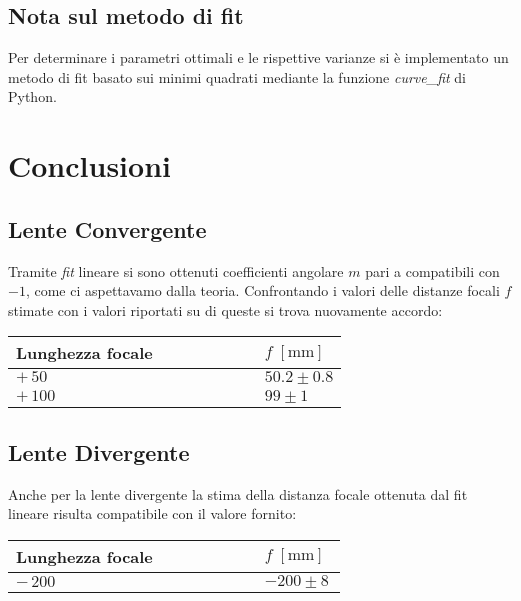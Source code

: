 \documentclass{article}[a4paper,11pt]
\begin{document}
\subsection*{Nota sul metodo di fit}
Per determinare i parametri ottimali e le rispettive varianze si \`e implementato un metodo di fit basato sui minimi quadrati mediante la funzione \emph{curve\_fit} di Python.

\section{Conclusioni}
\subsection*{Lente Convergente}
Tramite \emph{fit} lineare si sono ottenuti coefficienti angolare $m$ pari a compatibili con $-1$, come ci aspettavamo dalla teoria. Confrontando i valori delle distanze focali $f$ stimate con i valori riportati su di queste si trova nuovamente accordo:
\begin{table}[!hbt]
 \begin{center}
  \begin{tabular}{lccccccl}
  \toprule
  Lunghezza focale & & & & & & & $f \; [\si{\mm}]$ \\
  \midrule 
  \midrule
  $ +\, 50 $ & & & & & & & $ 50.2 \pm 0.8  $ \\
  $ +\, 100 $ & & & & & & & $ 99 \pm 1 $ \\ 
  \bottomrule 
  \end{tabular} 
 \end{center}
\end{table}
\subsection*{Lente Divergente}
Anche per la lente divergente la stima della distanza focale ottenuta dal fit lineare risulta compatibile con il valore fornito:
\begin{table}[!hbt]
 \begin{center}
  \begin{tabular}{lccccccl}
  \toprule
  Lunghezza focale & & & & & & & $f \; [\si{\mm}]$ \\
  \midrule 
  \midrule
  $ -\, 200 $ & & & & & & & $ -200 \pm 8 \ $ \\
  \bottomrule 
  \end{tabular} 
 \end{center}
\end{table}
\end{document}

